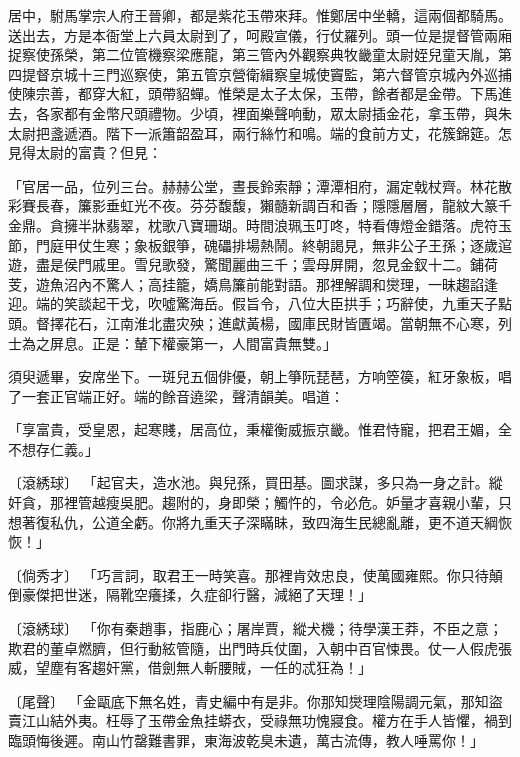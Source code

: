 居中，駙馬掌宗人府王晉卿，都是紫花玉帶來拜。惟鄭居中坐轎，這兩個都騎馬。送出去，方是本衙堂上六員太尉到了，呵殿宣儀，行仗羅列。頭一位是提督管兩廂捉察使孫榮，第二位管機察梁應龍，第三管內外觀察典牧畿童太尉姪兒童天胤，第四提督京城十三門巡察使，第五管京營衛緝察皇城使竇監，第六督管京城內外巡捕使陳宗善，都穿大紅，頭帶貂蟬。惟榮是太子太保，玉帶，餘者都是金帶。下馬進去，各家都有金幣尺頭禮物。少頃，裡面樂聲响動，眾太尉插金花，拿玉帶，與朱太尉把盞遞酒。階下一派簫韶盈耳，兩行絲竹和鳴。端的食前方丈，花簇錦筵。怎見得太尉的富貴？但見：

「官居一品，位列三台。赫赫公堂，晝長鈴索靜；潭潭相府，漏定戟杖齊。林花散彩賽長春，簾影垂虹光不夜。芬芬馥馥，獺髓新調百和香；隱隱層層，龍紋大篆千金鼎。貪擁半牀翡翠，枕歌八寶珊瑚。時間浪珮玉叮咚，特看傳燈金錯落。虎符玉節，門庭甲仗生寒；象板銀箏，磈礧排場熱鬧。終朝謁見，無非公子王孫；逐歲逭遊，盡是侯門戚里。雪兒歌發，驚聞麗曲三千；雲母屏開，忽見金釵十二。鋪荷芰，遊魚沼內不驚人；高挂籠，嬌鳥簾前能對語。那裡解調和爕理，一昧趨諂逢迎。端的笑談起干戈，吹噓驚海岳。假旨令，八位大臣拱手；巧辭使，九重天子點頭。督擇花石，江南淮北盡灾殃；進獻黃楊，國庫民財皆匱竭。當朝無不心寒，列士為之屏息。正是：輦下權豪第一，人間富貴無雙。」

須臾遞畢，安席坐下。一斑兒五個俳優，朝上箏阮琵琶，方响箜篌，紅牙象板，唱了一套正官端正好。端的餘音遶梁，聲清韻美。唱道：

「享富貴，受皇恩，起寒賤，居高位，秉權衡威振京畿。惟君恃寵，把君王媚，全不想存仁義。」

〔滾綉球〕  「起官夫，造水池。與兒孫，買田基。圖求謀，多只為一身之計。縱奸貪，那裡管越瘦吳肥。趨附的，身即榮；觸忤的，令必危。妒量才喜親小輩，只想著復私仇，公道全虧。你將九重天子深瞞眛，致四海生民總亂離，更不道天綱恢恢！」

〔倘秀才〕  「巧言詞，取君王一時笑喜。那裡肯效忠良，使萬國雍熙。你只待顛倒豪傑把世迷，隔靴空癢揉，久症卻行醫，減絕了天理！」

〔滾綉球〕  「你有秦趙事，指鹿心；屠岸賈，縱犬機；待學漢王莽，不臣之意；欺君的董卓燃臍，但行動絃管隨，出門時兵仗圍，入朝中百官悚畏。仗一人假虎張威，望塵有客趨奸黨，借劍無人斬腰賊，一任的忒狂為！」

〔尾聲〕  「金甌底下無名姓，青史編中有是非。你那知爕理陰陽調元氣，那知盜賣江山結外夷。枉辱了玉帶金魚挂蟒衣，受祿無功愧寢食。權方在手人皆懼，禍到臨頭悔後遲。南山竹罄難書罪，東海波乾臭未遺，萬古流傳，教人唾罵你！」

